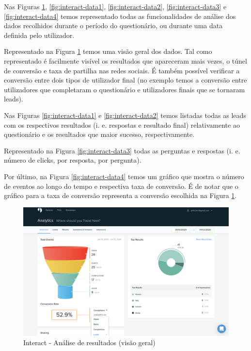 Nas Figuras \ref{fig:interact-data}, \ref{fig:interact-data1}, \ref{fig:interact-data2}, \ref{fig:interact-data3} e \ref{fig:interact-data4} temos representado todas as funcionalidades de análise dos dados recolhidos durante o período do questionário, ou durante uma data definida pelo utilizador.

Representado na Figura \ref{fig:interact-data} temos uma visão geral dos dados. Tal como representado é facilmente visível os resultados que apareceram mais vezes, o túnel de conversão e taxa de partilha nas redes sociais. É também possível verificar a conversão entre dois tipos de utilizador final (no exemplo temos a conversão entre utilizadores que completaram o questionário e utilizadores finais que se tornaram leads). 

Nas Figuras \ref{fig:interact-data1} e \ref{fig:interact-data2}  temos listadas todas as leads com os respectivos resultados (i. e. respostas e resultado final) relativamente ao questionário e os resultados que maior sucesso, respectivamente.

Representado na Figura \ref{fig:interact-data3}  todas as perguntas e respostas (i. e. número de clicks, por resposta, por pergunta). 

Por último, na Figura \ref{fig:interact-data4} temos um gráfico que mostra o número de eventos ao longo do tempo e respectiva taxa de conversão. É de notar que o gráfico para a taxa de conversão representa a conversão escolhida na Figura \ref{fig:interact-data}.


\mbox{}
\begin{figure}[ht!]
	\begin{center}
		\includegraphics[width=1\textwidth]{img/interact/data}
		\caption{Interact - Análise de resultados (visão geral)}
		\label{fig:interact-data}
	\end{center}
\end{figure}


